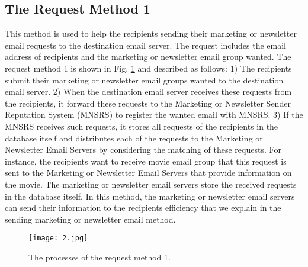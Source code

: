 \documentclass[conference]{IEEEtran}
\begin{document}
\subsection{The Request Method 1}
This method is used to help the recipients sending their marketing or newsletter email requests to the destination email server.
The request includes the email address of recipients and the marketing or newsletter email group wanted.
The request method 1 is
shown in Fig. \ref{fig:Method1} and described as follows:
1) The recipients submit their marketing or newsletter email groups wanted to the destination email server. 
2) When the destination email server receives these requests from the recipients, it forward these requests to the Marketing or Newsletter Sender Reputation System (MNSRS) to register the wanted email with MNSRS. 
3) If the MNSRS receives such requests, it stores all requests of the recipients in the database itself and distributes each of the requests to the Marketing or Newsletter Email Servers by considering the matching of these requests.
For instance, the recipients want to receive movie email group that this request is sent to the Marketing or Newsletter Email Servers that provide information on the movie.
The marketing or newsletter email servers store the received requests in the database itself.
In this method, the marketing or newsletter email servers can send their information to the recipients efficiency that we explain in the sending marketing or newsletter email method.

\begin{figure}
\centering
\texttt{[image: 2.jpg]}
\caption{The processes of the request method 1.}
\label{fig:Method1}
\end{figure}
\end{document}
